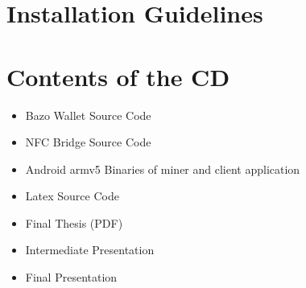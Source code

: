 \appendix

\chapter{Installation Guidelines}

\chapter{Contents of the CD}
\begin{itemize}
\item Bazo Wallet Source Code
\item NFC Bridge Source Code
\item Android armv5 Binaries of miner and client application
\item Latex Source Code
\item Final Thesis (PDF)
\item Intermediate Presentation
\item Final Presentation

\end{itemize}